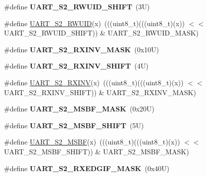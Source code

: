 \begin{DoxyCompactItemize}
\#define {\bfseries U\+A\+R\+T\+\_\+\+S2\+\_\+\+R\+W\+U\+I\+D\+\_\+\+S\+H\+I\+FT}~(3\+U)
\item 
\#define \mbox{\hyperlink{group___u_a_r_t___register___masks_ga7e1318e556cb7bc793cf3949d11ed655}{U\+A\+R\+T\+\_\+\+S2\+\_\+\+R\+W\+U\+ID}}(x)~(((uint8\+\_\+t)(((uint8\+\_\+t)(x)) $<$$<$ U\+A\+R\+T\+\_\+\+S2\+\_\+\+R\+W\+U\+I\+D\+\_\+\+S\+H\+I\+FT)) \& U\+A\+R\+T\+\_\+\+S2\+\_\+\+R\+W\+U\+I\+D\+\_\+\+M\+A\+SK)
\item 
\mbox{\label{group___u_a_r_t___register___masks_ga80b6af8d528290157cd93b8e33402e9e}} 
\#define {\bfseries U\+A\+R\+T\+\_\+\+S2\+\_\+\+R\+X\+I\+N\+V\+\_\+\+M\+A\+SK}~(0x10\+U)
\item 
\mbox{\label{group___u_a_r_t___register___masks_ga9e9f9f846534bbefdb7c7b88a66d29fc}} 
\#define {\bfseries U\+A\+R\+T\+\_\+\+S2\+\_\+\+R\+X\+I\+N\+V\+\_\+\+S\+H\+I\+FT}~(4\+U)
\item 
\#define \mbox{\hyperlink{group___u_a_r_t___register___masks_ga3cf566570570ff8a6a70e2cbea1959a8}{U\+A\+R\+T\+\_\+\+S2\+\_\+\+R\+X\+I\+NV}}(x)~(((uint8\+\_\+t)(((uint8\+\_\+t)(x)) $<$$<$ U\+A\+R\+T\+\_\+\+S2\+\_\+\+R\+X\+I\+N\+V\+\_\+\+S\+H\+I\+FT)) \& U\+A\+R\+T\+\_\+\+S2\+\_\+\+R\+X\+I\+N\+V\+\_\+\+M\+A\+SK)
\item 
\mbox{\label{group___u_a_r_t___register___masks_ga864a0b6ff26ed84f04d0b2f36a30468a}} 
\#define {\bfseries U\+A\+R\+T\+\_\+\+S2\+\_\+\+M\+S\+B\+F\+\_\+\+M\+A\+SK}~(0x20\+U)
\item 
\mbox{\label{group___u_a_r_t___register___masks_gaf1e853675fb82a43501d259573de5eca}} 
\#define {\bfseries U\+A\+R\+T\+\_\+\+S2\+\_\+\+M\+S\+B\+F\+\_\+\+S\+H\+I\+FT}~(5\+U)
\item 
\#define \mbox{\hyperlink{group___u_a_r_t___register___masks_ga4df4aaa4974f36b04468c277f050dc18}{U\+A\+R\+T\+\_\+\+S2\+\_\+\+M\+S\+BF}}(x)~(((uint8\+\_\+t)(((uint8\+\_\+t)(x)) $<$$<$ U\+A\+R\+T\+\_\+\+S2\+\_\+\+M\+S\+B\+F\+\_\+\+S\+H\+I\+FT)) \& U\+A\+R\+T\+\_\+\+S2\+\_\+\+M\+S\+B\+F\+\_\+\+M\+A\+SK)
\item 
\mbox{\label{group___u_a_r_t___register___masks_ga17b9dd16869c5185f2be9c1394fcede5}} 
\#define {\bfseries U\+A\+R\+T\+\_\+\+S2\+\_\+\+R\+X\+E\+D\+G\+I\+F\+\_\+\+M\+A\+SK}~(0x40\+U)
$$
\end{DoxyCompactItemize}
